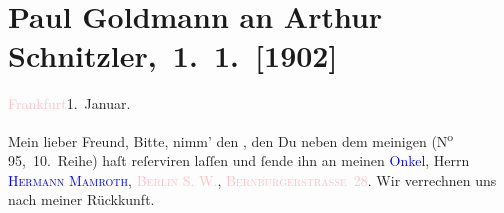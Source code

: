 

\renewcommand{\erwaehntePersonen}{Personen: Hermann Mamroth}
\renewcommand{\erwaehnteOrte}{Orte: Berlin, Bernburger Straße, Dessauer Straße, Deutsches Theater Berlin, Frankfurt am Main, Hotel Savoy}
\renewcommand{\erwaehnteWerke}{Werke: Lebendige Stunden. Vier Einakter, Tagebuch}
\section[ Paul Goldmann an Arthur Schnitzler, 1. 1. {[}1902{]}]{Paul Goldmann an Arthur Schnitzler, 1. 1. {[}1902{]}}
\nopagebreak{}
\rehead{ }\normalsize\beginnumbering{}
\toendnotes[C]{\smallbreak\pagebreak[2]}
\toendnotes[C]{\smallbreak}
\pstart
           \centering{}{\pb}\textcolor{pink}{Frankfurt}{}\ledrightnote{\textcolor{pink}{Frankfurt am Main}}{ }1. Januar.\pend
           
\pstart\center{}Mein lieber Freund,\pend
\pstart
           Bitte, nimm’ den \label{K_L03189-1v}\label{K_L03189-1h}, den Du neben dem meinigen (N\textsuperscript{o} 95, 10. Reihe)
               haſt reſerviren laſſen und ſende ihn an meinen \textcolor{blue}{Onkel}{}\ledrightnote{{$\rightarrow$}\textcolor{blue}{Hermann Mamroth}}, Herrn \textsc{\textcolor{blue}{Hermann Mamroth}{}\ledrightnote{\textcolor{blue}{Hermann Mamroth}}}, \textsc{\textcolor{pink}{Berlin S. W.}{}\ledrightnote{\textcolor{pink}{Berlin}}}, \textcolor{pink}{\textsc{Bernburgerstraße} 28}{}\ledrightnote{\textcolor{pink}{Bernburger Straße}}. Wir verrechnen uns nach meiner
               Rückkunft.\pend
           
